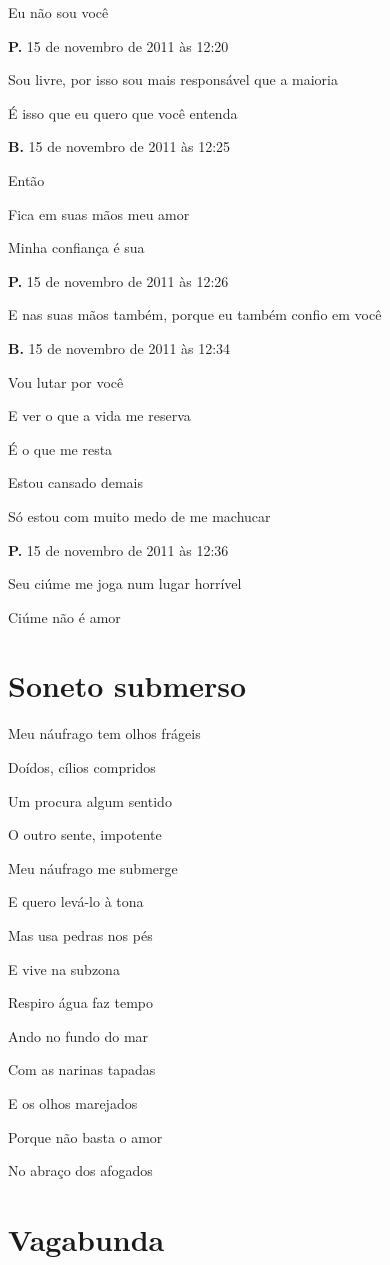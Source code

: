 Eu não sou você

\textbf{P.} 15 de novembro de 2011 às 12:20

Sou livre, por isso sou mais responsável que a maioria

É isso que eu quero que você entenda

\textbf{B.} 15 de novembro de 2011 às 12:25

Então

Fica em suas mãos meu amor

Minha confiança é sua

\textbf{P.} 15 de novembro de 2011 às 12:26

E nas suas mãos também, porque eu também confio em você

\textbf{B.} 15 de novembro de 2011 às 12:34

Vou lutar por você

E ver o que a vida me reserva

É o que me resta

Estou cansado demais

Só estou com muito medo de me machucar

\textbf{P.} 15 de novembro de 2011 às 12:36

Seu ciúme me joga num lugar horrível

Ciúme não é amor

\chapter{Soneto submerso}

Meu náufrago tem olhos frágeis

Doídos, cílios compridos

Um procura algum sentido

O outro sente, impotente

Meu náufrago me submerge

E quero levá-lo à tona

Mas usa pedras nos pés

E vive na subzona

Respiro água faz tempo

Ando no fundo do mar

Com as narinas tapadas

E os olhos marejados

Porque não basta o amor

No abraço dos afogados

\chapter{Vagabunda}

